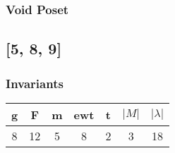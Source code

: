 \documentclass[a4paper]{article}
\begin{document}
\hfill\begin{minipage}{0.48\textwidth}
\subsubsection*{Void Poset}
\centering
{}
\end{minipage}
\newpage\subsection{[5, 8, 9]}
\noindent\begin{minipage}{0.6\textwidth}
\subsubsection*{Invariants}
\centering
\begin{tabular}{|c|c|c|c|c|c|c|}
\toprule
g & F & m & ewt & t & \(|M|\) & \(|\lambda|\) \\
\midrule
8 & 12 & 5 & 8 & 2 & 3 & 18 \\
\bottomrule
\end{tabular}
\end{minipage}%
\end{document}
